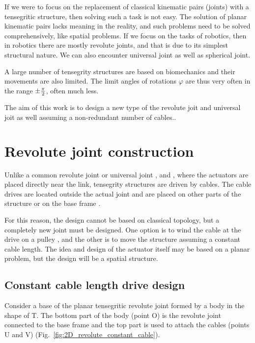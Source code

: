 \documentclass{article}
\begin{document}
If we were to focus on the replacement of classical kinematic pairs (joints) with a tensegritic structure, then solving such a task is not easy. The solution of planar kinematic pairs lacks meaning in the reality, and such problems need to be solved comprehensively, like spatial problems. If we focus on the tasks of robotics, then in robotics there are mostly revolute joints, and that is due to its simplest structural nature. We can also encounter universal joint as well as spherical joint.

A large number of tensegrity structures are based on biomechanics and their movements are also limited. The limit angles of rotations $\varphi$ are thus very often in the range $\pm{\pi \over 2}$, often much less.

The aim of this work is to design a new type of the revolute joit and universal joit as well assuming a non-redundant number of cables..


\section{Revolute joint construction}
Unlike a common revolute joint or universal joint \cite{Ref_Dumas_STIFFNESS_stiffness_identification_6dof}, \cite{Ref_Jubien_STIFFNESS_Identicication_KUKA} and \cite{Ref_Dumas_STIFFNESS_identicication_serial_robots}, where the actuators are placed directly near the link, tensegrity structures are driven by cables. The cable drives are located outside the actual joint and are placed on other parts \cite{Ref_Li_BIO_Tensegritic_shoulder} of the structure or on the base frame \cite{Ref_Lessard_BIO_lightweight_tens_joint}.

For this reason, the design cannot be based on classical topology, but a completely new joint must be designed. One option is to wind the cable at the drive on a pulley \cite{Ref_Krivosej_OWN_tensegrity_based_robots}, and the other is to move the structure assuming a constant cable length. The idea and design of the actuator itself may be based on a planar problem, but the design will be a  spatial structure.



\subsection{Constant cable length drive design}
Consider a base of the planar tensegritic revolute joint formed by a body in the shape of T. The bottom part of the body (point O) is the revolute joint connected to the base frame and the top part is used to attach the cables (points U and V) (Fig.~\ref{fig:2D_revolute_constant_cable}).
\end{document}
